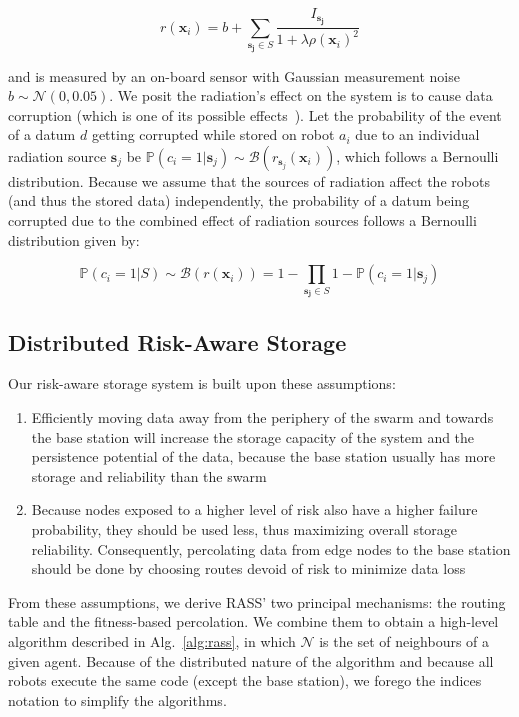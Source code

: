 \documentclass[runningheads]{llncs}
\begin{document}
\begin{equation}
    r(\bm{x}_i) = b + \sum_{\bm{s_j} \in S} \frac{I_{\bm{s_j}}}{1 + \lambda\rho(\bm{x}_i)^2}
    \label{eq:radiation}
\end{equation}

and is measured by an on-board sensor with Gaussian measurement noise
$b \sim \mathcal{N}(0, 0.05)$. We posit the radiation's effect on the system is to cause 
data corruption (which is one of its possible effects~\cite{messenger1986effects}). Let the 
probability of the event of a datum $d$ getting corrupted while stored on robot $a_i$ due 
to an individual radiation  source $\bm{s}_j$ be
$\mathbb{P}(c_i = 1 | \bm{s}_j) \sim
\mathcal{B}(r_{\bm{s}_j}(\bm{x}_i))$, which follows a Bernoulli
distribution. Because we assume that the sources of radiation affect
the robots (and thus the stored data) independently, the probability of a datum being 
corrupted due to the combined effect of radiation sources follows a Bernoulli 
distribution given by:

\begin{equation}
    \mathbb{P}(c_i = 1 | S) \sim \mathcal{B}(r(\bm{x}_i)) = 1 - \prod_{\bm{s_j} \in S} 1 - \mathbb{P}(c_i = 1 | \bm{s}_j)
    \label{eq:failure}
\end{equation}


\subsection{Distributed Risk-Aware Storage}
Our risk-aware storage system is built upon these assumptions:

\begin{enumerate}
\item Efficiently moving data away from the periphery of the swarm and
  towards the base station will increase the storage capacity of the
  system and the persistence potential of the data, because the base
  station usually has more storage and reliability than the swarm
\item Because nodes exposed to a higher level of risk also have a higher
  failure probability, they should be used less, thus
  maximizing overall storage reliability. Consequently, percolating data from edge nodes to the base station should be done by choosing routes devoid of risk to minimize data loss
\end{enumerate}

From these assumptions, we derive RASS' two principal mechanisms: the routing table and the fitness-based percolation. We combine them to obtain a high-level algorithm described in Alg.~\ref{alg:rass}, in which $\mathcal{N}$ is the set of neighbours of a given agent. Because of the distributed nature of the algorithm and because all robots execute the same code (except the base station), we forego the indices notation to simplify the algorithms.
\end{document}

